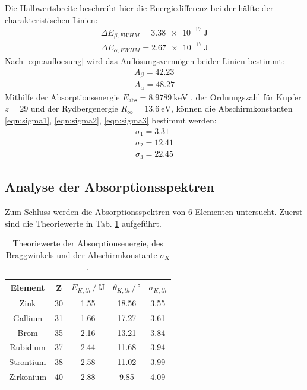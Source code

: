 Die Halbwertsbreite beschreibt hier die Energiedifferenz bei der hälfte der charakteristischen Linien:
\begin{align*}
    \Delta E_{\beta, FWHM} = \SI{3.38e-17}{\joule} \\
    \Delta E_{\alpha, FWHM} = \SI{2.67e-17}{\joule}
\end{align*}
Nach \eqref{eqn:aufloesung} wird das Auflösungsvermögen beider Linien bestimmt:
\begin{align}
    A_\beta = 42.23 \\
    A_\alpha = 48.27
    \label{eqn:erg_A}
\end{align}
Mithilfe der Absorptionsenergie $E_\text{abs} = \SI{8.9789}{\kilo\electronvolt}$ \cite{k_kante}, der Ordnungszahl für Kupfer $z = 29$ und der Rydbergenergie $R_\infty = \SI{13.6}{\electronvolt}$, können die Abschirmkonstanten \eqref{eqn:sigma1}, \eqref{eqn:sigma2}, \eqref{eqn:sigma3} bestimmt werden:
\begin{align}
    \sigma_1 = 3.31 \\
    \sigma_2 = 12.41 \\
    \sigma_3 = 22.45
    \label{eqn:erg_abschirm}
\end{align}

\subsection{Analyse der Absorptionsspektren}
Zum Schluss werden die Absorptionsspektren von 6 Elementen untersucht.
Zuerst sind die Theoriewerte \cite{k_kante} in Tab. \ref{tab:theorie} aufgeführt.
\begin{table}
    \centering
    \begin{tabular}{c|cccc}
    \toprule
    Element & Z & $E_{K, th} \,/\, \si{\femto\joule}$ & $\theta_{K, th} \,/\, \si{\degree}$ & $\sigma_{K, th}$ \\
    \midrule
    Zink & 30 & 1.55 & 18.56 & 3.55 \\
    Gallium & 31 & 1.66 & 17.27 & 3.61 \\
    Brom & 35 & 2.16 & 13.21 & 3.84 \\
    Rubidium & 37 & 2.44 & 11.68 & 3.94 \\
    Strontium & 38 & 2.58 & 11.02 & 3.99 \\
    Zirkonium & 40 & 2.88 & 9.85 & 4.09 \\
    \bottomrule
    \end{tabular}
    \caption{Theoriewerte der Absorptionsenergie, des Braggwinkels und der Abschirmkonstante $\sigma_K$. \cite{k_kante}}
    \label{tab:theorie}
\end{table}
\FloatBarrier


